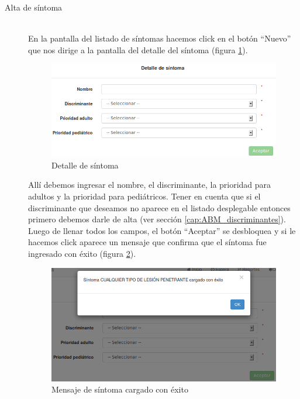 \begin{description}
\item[Alta de síntoma] \mbox{} \\
En la pantalla del listado de síntomas hacemos click en el botón ``Nuevo'' que nos dirige a la pantalla del detalle del síntoma (figura \ref{fig:detalle_sintoma}).
\begin{figure}
\centerline{\includegraphics[width=1\textwidth]{detalle_sintoma.png}}
\caption{Detalle de síntoma}
\label{fig:detalle_sintoma}
\end{figure}
Allí debemos ingresar el nombre, el discriminante, la prioridad para adultos y la prioridad para pediátricos. Tener en cuenta que si el discriminante que deseamos no aparece en el listado desplegable entonces primero debemos darle de alta (ver sección \ref{cap:ABM_discriminantes}). Luego de llenar todos los campos, el botón ``Aceptar'' se desbloquea y si le hacemos click aparece un mensaje que confirma que el síntoma fue ingresado con éxito (figura \ref{fig:sintoma_cargado_con_exito}).
\begin{figure}
\centerline{\includegraphics[width=1\textwidth]{sintoma_cargado_con_exito.png}}
\caption{Mensaje de síntoma cargado con éxito}
\label{fig:sintoma_cargado_con_exito}
\end{figure}


\end{description}
